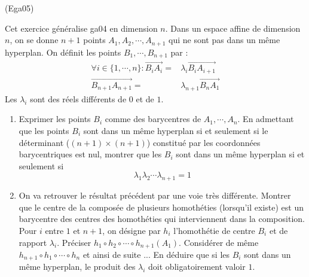 \begin{tiny}(Ega05)\end{tiny} Cet exercice généralise ga04 en dimension $n$. Dans un espace affine de dimension $n$, on se donne $n+1$ points $A_1, A_2, \cdots, A_{n+1}$ qui ne sont pas dans un même hyperplan. On définit les points $B_1,\cdots,B_{n+1}$ par :
 \begin{align*}
  \forall i \in \{1,\cdots,n\} : \overrightarrow{B_iA_i} =& \lambda_i \overrightarrow{B_iA_{i+1}}\\
\overrightarrow{B_{n+1}A_{n+1}} =& \lambda_{n+1} \overrightarrow{B_nA_{1}}
 \end{align*}
Les $\lambda_i$ sont des réels différents de $0$ et de $1$.
\begin{enumerate}
\item Exprimer les points $B_i$ comme des barycentres de $A_1,\cdots,A_n$. En admettant que les points $B_i$ sont dans un même hyperplan si et seulement si le déterminant ($(n+1)\times(n+1)$) constitué par les coordonnées barycentriques est nul, montrer que les $B_i$ sont dans un même hyperplan si et seulement si
\begin{displaymath}
 \lambda_1\lambda_2\cdots \lambda_{n+1}=1
\end{displaymath}
\item On va retrouver le résultat précédent par une voie très différente.\newline
Montrer que le centre de la composée de plusieurs homothéties (lorsqu'il existe) est un barycentre des centres des homothéties qui interviennent dans la composition.\newline
Pour $i$ entre $1$ et $n+1$, on désigne par $h_i$ l'homothétie de centre $B_i$ et de rapport $\lambda_i$.\newline
Préciser $h_1\circ h_2\circ\cdots\circ h_{n+1}(A_1)$. Considérer de même $h_{n+1}\circ h_1\circ\cdots\circ h_{n}$ et ainsi de suite ... En déduire que si les $B_i$ sont dans un même hyperplan, le produit des $\lambda_i$ doit obligatoirement valoir $1$.
\end{enumerate}
